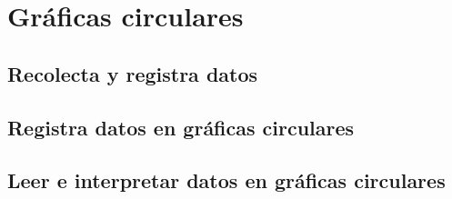 \thispagestyle{plain}

\section{Gráficas circulares}

\subsection{Recolecta y registra datos}

\subsection{Registra datos en gráficas circulares}

\subsection{Leer e interpretar datos en gráficas circulares}

\newpage